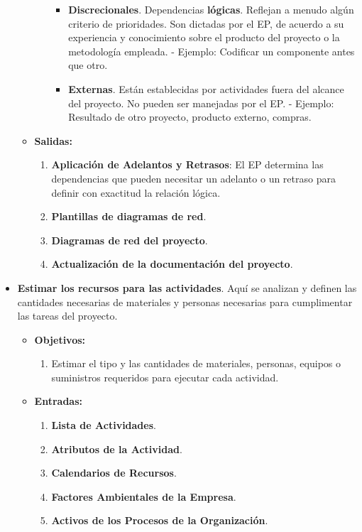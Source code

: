 \documentclass[10pt,a4paper]{article}
\begin{document}
\begin{itemize}
\begin{itemize}
\begin{enumerate}
\begin{itemize}
\item \textbf{Discrecionales}.
Dependencias \textbf{lógicas}. Reflejan a menudo algún criterio de
prioridades. Son dictadas por el EP, de acuerdo a su experiencia y conocimiento sobre el producto del proyecto o la metodología empleada.
\subitem - Ejemplo: Codificar un componente antes que otro.

\item \textbf{Externas}.
Están establecidas por actividades fuera del alcance del proyecto. No
pueden ser manejadas por el EP.
\subitem - Ejemplo: Resultado de otro proyecto, producto externo, compras.
\end{itemize}
\end{enumerate}

\item \textbf{Salidas:}
\begin{enumerate}
\item \textbf{Aplicación de Adelantos y Retrasos}: El EP determina las dependencias que pueden necesitar un adelanto o un retraso para definir con exactitud la relación lógica.
\item \textbf{Plantillas de diagramas de red}.
\item \textbf{Diagramas de red del proyecto}.
\item \textbf{Actualización de la documentación del proyecto}.
\end{enumerate}
\end{itemize}

\item \textbf{Estimar los recursos para las actividades}. Aquí se analizan y definen las cantidades necesarias de materiales y personas necesarias para cumplimentar las tareas del proyecto.

\begin{itemize}
\item \textbf{Objetivos:}
\begin{enumerate}
\item Estimar el tipo y las cantidades de materiales, personas, equipos o suministros requeridos para ejecutar cada actividad.
\end{enumerate}

\item \textbf{Entradas:}
\begin{enumerate}
\item \textbf{Lista de Actividades}.
\item \textbf{Atributos de la Actividad}.
\item \textbf{Calendarios de Recursos}.
\item \textbf{Factores Ambientales de la Empresa}.
\item \textbf{Activos de los Procesos de la Organización}.
\end{enumerate}


\end{itemize}
\end{itemize}
\end{document}
